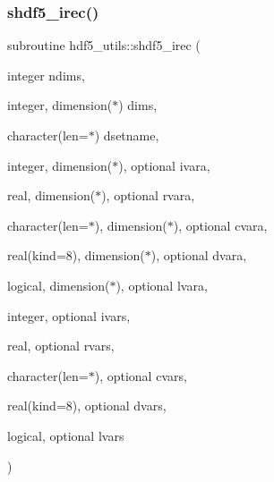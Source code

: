 \subsubsection{\texorpdfstring{shdf5\+\_\+irec()}{shdf5\_irec()}}
{\footnotesize\ttfamily subroutine hdf5\+\_\+utils\+::shdf5\+\_\+irec (\begin{DoxyParamCaption}\item[{integer}]{ndims,  }\item[{integer, dimension($\ast$)}]{dims,  }\item[{character(len=$\ast$)}]{dsetname,  }\item[{integer, dimension($\ast$), optional}]{ivara,  }\item[{real, dimension($\ast$), optional}]{rvara,  }\item[{character(len=$\ast$), dimension($\ast$), optional}]{cvara,  }\item[{real(kind=8), dimension($\ast$), optional}]{dvara,  }\item[{logical, dimension($\ast$), optional}]{lvara,  }\item[{integer, optional}]{ivars,  }\item[{real, optional}]{rvars,  }\item[{character(len=$\ast$), optional}]{cvars,  }\item[{real(kind=8), optional}]{dvars,  }\item[{logical, optional}]{lvars }\end{DoxyParamCaption})}

\mbox{\label{namespacehdf5__utils_a84928db7f00b3aedc24a2c20281dddb1}} 
